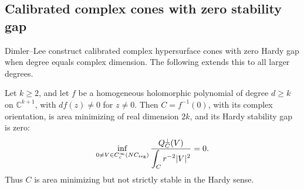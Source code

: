 \subsection{Calibrated complex cones with zero stability gap}
\label{sec:prelim-complex-gap}

Dimler--Lee \cite[Theorem~4.2]{DimlerLee24} construct calibrated
complex hypersurface cones with zero Hardy gap when degree equals
complex dimension. The following extends this to all larger degrees.

\begin{proposition}
\label{prop:complex-zero-gap}
Let \(k\geq2\), and let \(f\) be a homogeneous holomorphic polynomial
of degree \(d\geq k\) on \(\mathbb C^{k+1}\), with \(df(z)\ne0\) for
\(z\ne0\).  Then \(C=f^{-1}(0)\), with its complex orientation, is
area minimizing of real dimension \(2k\), and its Hardy stability gap
is zero:
\begin{equation}\label{eq:complex-zero-gap}
 \inf_{0\ne V\in C_c^\infty(NC_{\mathrm{reg}})}
 \frac{Q_C^\perp(V)}{\displaystyle\int_Cr^{-2}|V|^2}=0.
\end{equation}
Thus \(C\) is area minimizing but not strictly stable in the Hardy sense.
\end{proposition}

